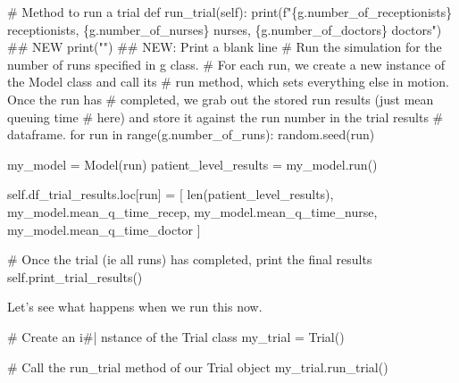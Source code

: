 \documentclass[
  letterpaper,
  DIV=11,
  numbers=noendperiod]{scrreprt}
\newenvironment{Shaded}{}{}
\newcommand{\BuiltInTok}[1]{\textcolor[rgb]{0.84,0.23,0.29}{#1}}
\newcommand{\CommentTok}[1]{\textcolor[rgb]{0.42,0.45,0.49}{#1}}
\newcommand{\ControlFlowTok}[1]{\textcolor[rgb]{0.84,0.23,0.29}{#1}}
\newcommand{\KeywordTok}[1]{\textcolor[rgb]{0.84,0.23,0.29}{#1}}
\newcommand{\NormalTok}[1]{\textcolor[rgb]{0.14,0.16,0.18}{#1}}
\newcommand{\OperatorTok}[1]{\textcolor[rgb]{0.14,0.16,0.18}{#1}}
\newcommand{\SpecialCharTok}[1]{\textcolor[rgb]{0.00,0.36,0.77}{#1}}
\newcommand{\SpecialStringTok}[1]{\textcolor[rgb]{0.01,0.18,0.38}{#1}}
\newcommand{\StringTok}[1]{\textcolor[rgb]{0.01,0.18,0.38}{#1}}
\newcommand{\VariableTok}[1]{\textcolor[rgb]{0.89,0.38,0.04}{#1}}
\begin{document}
\begin{Shaded}
\begin{Highlighting}[]
    \CommentTok{\# Method to run a trial}
    \KeywordTok{def}\NormalTok{ run\_trial(}\VariableTok{self}\NormalTok{):}
        \BuiltInTok{print}\NormalTok{(}\SpecialStringTok{f"}\SpecialCharTok{\{}\NormalTok{g}\SpecialCharTok{.}\NormalTok{number\_of\_receptionists}\SpecialCharTok{\}}\SpecialStringTok{ receptionists, }\SpecialCharTok{\{}\NormalTok{g}\SpecialCharTok{.}\NormalTok{number\_of\_nurses}\SpecialCharTok{\}}\SpecialStringTok{ nurses, }\SpecialCharTok{\{}\NormalTok{g}\SpecialCharTok{.}\NormalTok{number\_of\_doctors}\SpecialCharTok{\}}\SpecialStringTok{ doctors"}\NormalTok{) }\CommentTok{\#\# NEW}
        \BuiltInTok{print}\NormalTok{(}\StringTok{""}\NormalTok{) }\CommentTok{\#\# NEW: Print a blank line}
        \CommentTok{\# Run the simulation for the number of runs specified in g class.}
        \CommentTok{\# For each run, we create a new instance of the Model class and call its}
        \CommentTok{\# run method, which sets everything else in motion.  Once the run has}
        \CommentTok{\# completed, we grab out the stored run results (just mean queuing time}
        \CommentTok{\# here) and store it against the run number in the trial results}
        \CommentTok{\# dataframe.}
        \ControlFlowTok{for}\NormalTok{ run }\KeywordTok{in} \BuiltInTok{range}\NormalTok{(g.number\_of\_runs):}
\NormalTok{            random.seed(run)}

\NormalTok{            my\_model }\OperatorTok{=}\NormalTok{ Model(run)}
\NormalTok{            patient\_level\_results }\OperatorTok{=}\NormalTok{ my\_model.run()}

            \VariableTok{self}\NormalTok{.df\_trial\_results.loc[run] }\OperatorTok{=}\NormalTok{ [}
                \BuiltInTok{len}\NormalTok{(patient\_level\_results),}
\NormalTok{                my\_model.mean\_q\_time\_recep,}
\NormalTok{                my\_model.mean\_q\_time\_nurse,}
\NormalTok{                my\_model.mean\_q\_time\_doctor}
\NormalTok{                ]}

        \CommentTok{\# Once the trial (ie all runs) has completed, print the final results}
        \VariableTok{self}\NormalTok{.print\_trial\_results()}
\end{Highlighting}
\end{Shaded}

Let's see what happens when we run this now.

\begin{Shaded}
\begin{Highlighting}[]
\CommentTok{\# Create an i\#| nstance of the Trial class}
\NormalTok{my\_trial }\OperatorTok{=}\NormalTok{ Trial()}

\CommentTok{\# Call the run\_trial method of our Trial object}
\NormalTok{my\_trial.run\_trial()}
\end{Highlighting}
\end{Shaded}
\end{document}
